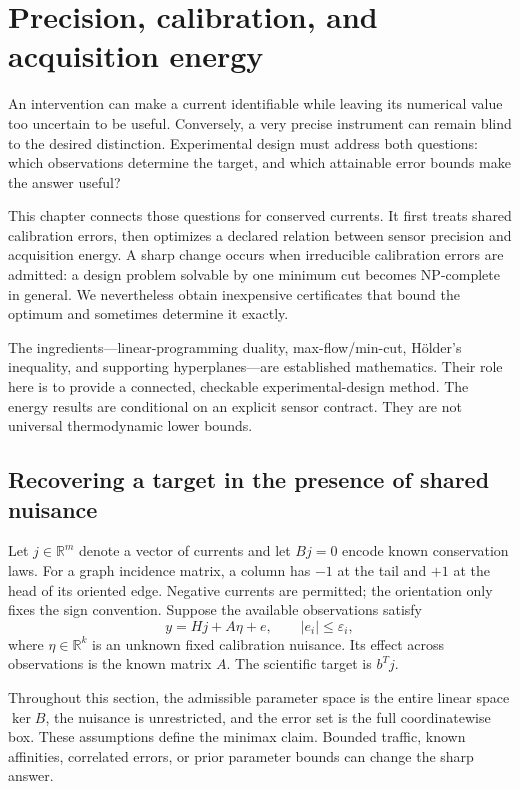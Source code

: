 \chapter{Precision, calibration, and acquisition energy}
\label{ch:access-resources}

An intervention can make a current identifiable while leaving its numerical
value too uncertain to be useful. Conversely, a very precise instrument can
remain blind to the desired distinction. Experimental design must address both
questions: which observations determine the target, and which attainable error
bounds make the answer useful?

This chapter connects those questions for conserved currents. It first treats
shared calibration errors, then optimizes a declared relation between sensor
precision and acquisition energy. A sharp change occurs when irreducible
calibration errors are admitted: a design problem solvable by one minimum cut
becomes NP-complete in general. We nevertheless obtain inexpensive certificates
that bound the optimum and sometimes determine it exactly.

The ingredients---linear-programming duality, max-flow/min-cut, H\"older's
inequality, and supporting hyperplanes---are established mathematics. Their
role here is to provide a connected, checkable experimental-design method.
The energy results are conditional on an explicit sensor contract. They are
not universal thermodynamic lower bounds.

\section{Recovering a target in the presence of shared nuisance}

Let $j\in\mathbb R^m$ denote a vector of currents and let $Bj=0$ encode known
conservation laws. For a graph incidence matrix, a column has $-1$ at the tail
and $+1$ at the head of its oriented edge. Negative currents are permitted;
the orientation only fixes the sign convention. Suppose the available
observations satisfy
\begin{equation}
 y=Hj+A\eta+e,\qquad |e_i|\leq\varepsilon_i,
 \label{eq:res-observation}
\end{equation}
where $\eta\in\mathbb R^k$ is an unknown fixed calibration nuisance. Its effect
across observations is the known matrix $A$. The scientific target is $b^Tj$.

Throughout this section, the admissible parameter space is the entire linear
space $\ker B$, the nuisance is unrestricted, and the error set is the full
coordinatewise box. These assumptions define the minimax claim. Bounded
traffic, known affinities, correlated errors, or prior parameter bounds can
change the sharp answer.

